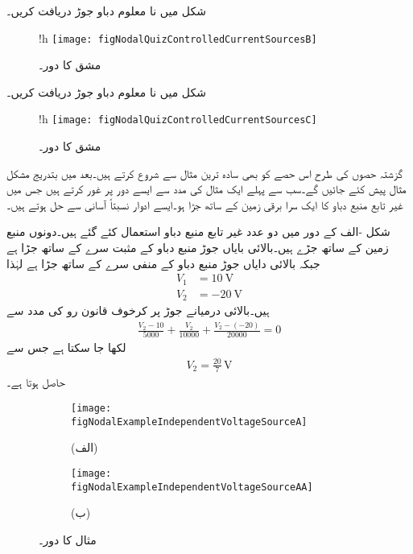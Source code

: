 شکل  میں نا معلوم دباو جوڑ  دریافت کریں۔ 
\begin{figure}{!h}
\centering
\texttt{[image: figNodalQuizControlledCurrentSourcesB]}
\caption{مشق  کا دور۔}
\label{شکل_مشق_جوڑ_تابع_منبع_رو_ب}
\end{figure}

شکل  میں نا معلوم دباو جوڑ  دریافت کریں۔ 
\begin{figure}{!h}
\centering
\texttt{[image: figNodalQuizControlledCurrentSourcesC]}
\caption{مشق  کا دور۔}
\label{شکل_مشق_جوڑ_تابع_منبع_رو_پ}
\end{figure}

گزشتہ حصوں کی طرح اس حصے کو بھی سادہ ترین مثال سے شروع کرتے ہیں۔بعد میں بتدریج مشکل مثال پیش کئے جائیں گے۔سب سے پہلے ایک مثال کی مدد سے ایسے دور پر غور کرتے ہیں جس میں غیر تابع منبع دباو کا ایک سرا  برقی زمین کے ساتھ جڑا ہو۔ایسے ادوار نسبتاً آسانی سے حل ہوتے ہیں۔

شکل -الف کے دور میں دو عدد غیر تابع منبع دباو استعمال کئے گئے ہیں۔دونوں منبع  زمین کے ساتھ جڑے ہیں۔بالائی بایاں جوڑ  منبع دباو کے مثبت سرے کے ساتھ جڑا ہے  جبکہ بالائی دایاں جوڑ  منبع دباو کے منفی سرے کے ساتھ جڑا ہے لہٰذا
\begin{align*}
V_1&=\SI{10}{\volt}\\
V_2&=\SI{-20}{\volt}
\end{align*} 
ہیں۔بالائی درمیانے جوڑ پر کرخوف قانون رو کی مدد سے
\begin{align*}
\frac{V_2-10}{5000}+\frac{V_2}{10000}+\frac{V_2-(-20)}{20000}=0
\end{align*}
لکھا جا سکتا ہے جس سے
\begin{align*}
V_2=\frac{20}{7} \, \si{\volt}
\end{align*}
حاصل ہوتا ہے۔
\begin{figure}
\centering
\begin{subfigure}{1\textwidth}
\centering
\texttt{[image: figNodalExampleIndependentVoltageSourceA]}
\caption*{(الف)}
\end{subfigure}
\begin{subfigure}{1\textwidth}
\centering
\texttt{[image: figNodalExampleIndependentVoltageSourceAA]}
\caption*{(ب)}
\end{subfigure}
\caption{مثال  کا دور۔}
\label{شکل_جوڑ_غیر_تابع_منبع_دباو_الف}
\end{figure}

